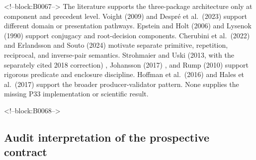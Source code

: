 \documentclass[11pt,a4paper]{article}
\begin{document}
<!--block:B0067-->
The literature supports the three-package architecture only at component and precedent level. Voight (2009)
\citep{P33-S10}
 and Despré et al.~(2023)
\citep{P33-S11}
 support different domain or presentation pathways. Epstein and Holt (2006)
\citep{P33-S12}
 and Lysenok (1990)
\citep{P33-S13}
 support conjugacy and root-decision components. Cherubini et al.~(2022)
\citep{P33-S14}
 and Erlandsson and Souto (2024)
\citep{P33-S15}
 motivate separate primitive, repetition, reciprocal, and inverse-pair semantics. Strohmaier and Uski (2013, with the separately cited 2018 correction)
\citep{P33-S16,P33-S16-CORR}
, Johansson (2017)
\citep{P33-S17}
, and Rump (2010)
\citep{P33-S18}
 support rigorous predicate and enclosure discipline. Hoffman et al.~(2016)
\citep{P33-S19}
 and Hales et al.~(2017)
\citep{P33-S20}
 support the broader producer-validator pattern. None supplies the missing P33 implementation or scientific result.

<!--block:B0068-->
\subsection{Audit interpretation of the prospective contract}
\end{document}

